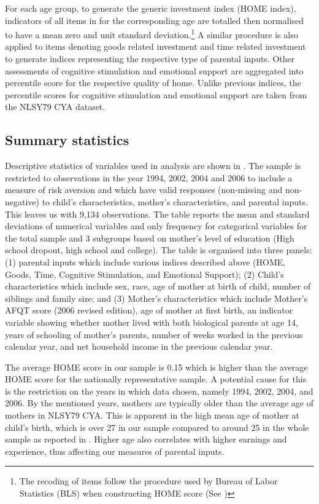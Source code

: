 \documentclass[]{article}
\begin{document}
For each age group, to generate the generic investment index (HOME index), indicators of all items in  for the corresponding age are totalled then normalised to have a mean zero and unit standard deviation.\footnote{The recoding of items follow the procedure used by Bureau of Labor Statistics (BLS) when constructing HOME score (See \citet{center2004nlsy79})} A similar procedure is also applied to items denoting goods related investment and time related investment to generate indices representing the respective type of parental inputs. Other assessments of cognitive stimulation and emotional support are aggregated into percentile score for the respective quality of home. Unlike previous indices, the percentile scores for cognitive  stimulation and emotional support are taken from the NLSY79 CYA dataset.




\subsection{Summary statistics}


Descriptive statistics of variables used in analysis are shown in . The sample is restricted to observations in the year 1994, 2002, 2004 and 2006 to include a measure of risk aversion and which have valid responses (non-missing and non-negative) to child's characteristics, mother's characteristics, and parental inputs. This leaves us with 9,134 observations. The table reports the mean and standard deviations of numerical variables and only frequency for categorical variables for the total sample and 3 subgroups based on mother's level of education (High school dropout, high school and college). The table is organised into three panels: (1) parental inputs which include various indices described above (HOME, Goods, Time, Cognitive Stimulation, and Emotional Support); (2) Child's characteristics which include sex, race, age of mother at birth of child, number of siblings and family size; and (3) Mother's characteristics which include Mother's AFQT score (2006 revised edition), age of mother at first birth, an indicator variable showing whether mother lived with both biological parents at age 14, years of schooling of mother's parents, number of weeks worked in the previous calendar year, and net household income in the previous calendar year.


The average HOME score in our sample is 0.15 which is higher than the average HOME score for the nationally representative sample. A potential cause for this is the restriction on the years in which data chosen, namely 1994, 2002, 2004, and 2006. By the mentioned years, mothers are typically older than the average age of mothers in NLSY79 CYA. This is apparent in the high mean age of mother at child's birth, which is over 27 in our sample compared to around 25 in the whole sample as reported in \citet{carneiro2016partial}. Higher age also correlates with higher earnings and experience, thus affecting our measures of parental inputs. 
\end{document}
